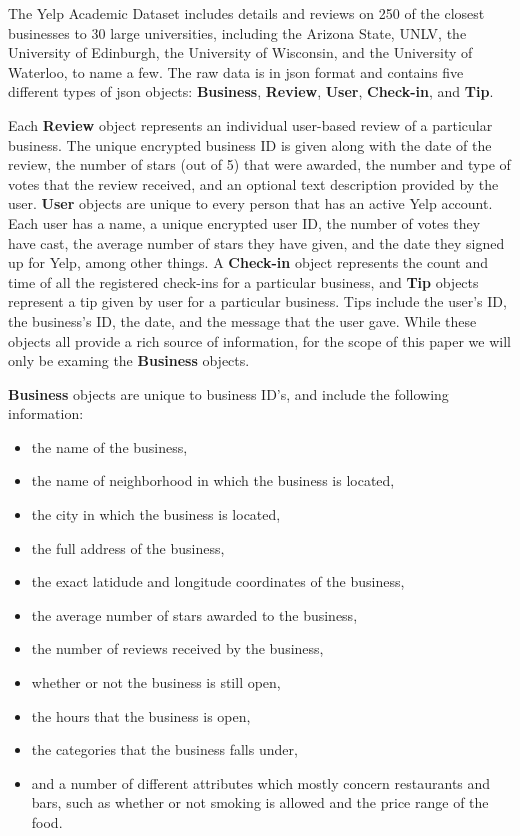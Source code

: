 \documentclass[11pt]{article}
\begin{document}
The Yelp Academic Dataset includes details and reviews on 250 of the closest businesses to 30 large universities, including the Arizona State, UNLV, the University of Edinburgh, the University of Wisconsin, and the University of Waterloo, to name a few. The raw data is in json format and contains five different types of json objects: \textbf{Business}, \textbf{Review}, \textbf{User}, \textbf{Check-in}, and \textbf{Tip}.

Each \textbf{Review} object represents an individual user-based review of a particular business. The unique encrypted business ID is given along with the date of the review, the number of stars (out of 5) that were awarded, the number and type of votes that the review received, and an optional text description provided by the user. \textbf{User} objects are unique to every person that has an active Yelp account. Each user has a name, a unique encrypted user ID, the number of votes they have cast, the average number of stars they have given, and the date they signed up for Yelp, among other things. A \textbf{Check-in} object represents the count and time of all the registered check-ins for a particular business, and \textbf{Tip} objects represent a tip given by user for a particular business. Tips include the user's ID, the business's ID, the date, and the message that the user gave. While these objects all provide a rich source of information, for the scope of this paper we will only be examing the \textbf{Business} objects.

\textbf{Business} objects are unique to business ID's, and include the following information:
\begin{itemize}
	\item the name of the business,
	\item the name of neighborhood in which the business is located,
	\item the city in which the business is located,
	\item the full address of the business,
	\item the exact latidude and longitude coordinates of the business,
	\item the average number of stars awarded to the business,
	\item the number of reviews received by the business,
	\item whether or not the business is still open,
	\item the hours that the business is open,
	\item the categories that the business falls under,
	\item and a number of different attributes which mostly concern restaurants and bars, such as whether or not smoking is allowed and the price range of the food.
\end{itemize}
\end{document}
